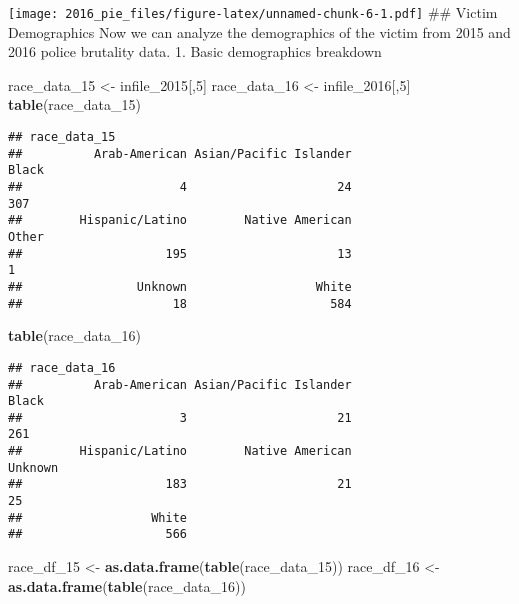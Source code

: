 \documentclass[
]{article}
\newenvironment{Shaded}{\begin{snugshade}}{\end{snugshade}}
\newcommand{\DecValTok}[1]{\textcolor[rgb]{0.00,0.00,0.81}{#1}}
\newcommand{\KeywordTok}[1]{\textcolor[rgb]{0.13,0.29,0.53}{\textbf{#1}}}
\newcommand{\NormalTok}[1]{#1}
\newcommand{\StringTok}[1]{\textcolor[rgb]{0.31,0.60,0.02}{#1}}
\begin{document}
\texttt{[image: 2016\_pie\_files/figure-latex/unnamed-chunk-6-1.pdf]} \#\#
Victim Demographics Now we can analyze the demographics of the victim
from 2015 and 2016 police brutality data. 1. Basic demographics
breakdown

\begin{Shaded}
\begin{Highlighting}[]
\NormalTok{race_data_}\DecValTok{15}\NormalTok{ <-}\StringTok{ }\NormalTok{infile_}\DecValTok{2015}\NormalTok{[,}\DecValTok{5}\NormalTok{]}
\NormalTok{race_data_}\DecValTok{16}\NormalTok{ <-}\StringTok{ }\NormalTok{infile_}\DecValTok{2016}\NormalTok{[,}\DecValTok{5}\NormalTok{]}
\KeywordTok{table}\NormalTok{(race_data_}\DecValTok{15}\NormalTok{)}
\end{Highlighting}
\end{Shaded}

\begin{verbatim}
## race_data_15
##          Arab-American Asian/Pacific Islander                  Black 
##                      4                     24                    307 
##        Hispanic/Latino        Native American                  Other 
##                    195                     13                      1 
##                Unknown                  White 
##                     18                    584
\end{verbatim}

\begin{Shaded}
\begin{Highlighting}[]
\KeywordTok{table}\NormalTok{(race_data_}\DecValTok{16}\NormalTok{)}
\end{Highlighting}
\end{Shaded}

\begin{verbatim}
## race_data_16
##          Arab-American Asian/Pacific Islander                  Black 
##                      3                     21                    261 
##        Hispanic/Latino        Native American                Unknown 
##                    183                     21                     25 
##                  White 
##                    566
\end{verbatim}

\begin{Shaded}
\begin{Highlighting}[]
\NormalTok{race_df_}\DecValTok{15}\NormalTok{ <-}\StringTok{ }\KeywordTok{as.data.frame}\NormalTok{(}\KeywordTok{table}\NormalTok{(race_data_}\DecValTok{15}\NormalTok{))}
\NormalTok{race_df_}\DecValTok{16}\NormalTok{ <-}\StringTok{ }\KeywordTok{as.data.frame}\NormalTok{(}\KeywordTok{table}\NormalTok{(race_data_}\DecValTok{16}\NormalTok{))}
\end{Highlighting}
\end{Shaded}
\end{document}
